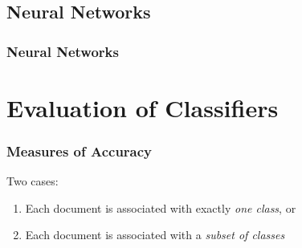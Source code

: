 \documentclass{beamer}
\begin{document}


\subsection{Neural Networks}

\begin{frame}
    \frametitle{Neural Networks}
\end{frame}


\section{Evaluation of Classifiers}

\begin{frame} \frametitle{Measures of Accuracy}
  Two cases:
  \begin{enumerate}
  \item Each document is associated with exactly \emph{one class}, or
  \item Each document is associated with a \emph{subset of classes}
  \end{enumerate}
\end{frame}

\end{document}
